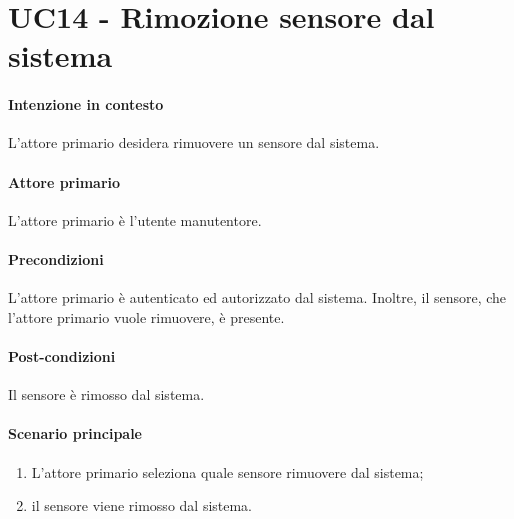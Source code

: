 \section{UC14 - Rimozione sensore dal sistema}\label{uc:14}


\paragraph{Intenzione in contesto}
L'attore primario desidera rimuovere un sensore dal sistema.
\paragraph{Attore primario}L'attore primario è l'utente manutentore.

\paragraph{Precondizioni} L'attore primario è autenticato ed autorizzato dal sistema. Inoltre, il sensore, che l'attore primario vuole rimuovere, è presente.

\paragraph{Post-condizioni} Il sensore è rimosso dal sistema.
\paragraph{Scenario principale}
\begin{enumerate}
    \item L'attore primario seleziona quale sensore rimuovere dal sistema;
    \item il sensore viene rimosso dal sistema.
\end{enumerate}